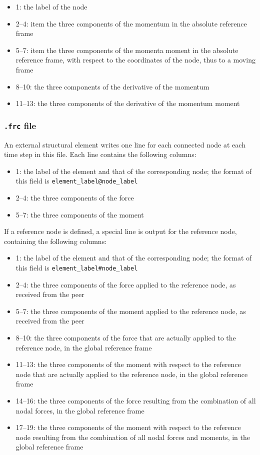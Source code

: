 \begin{itemize}
    \item 1: the label of the node
    \item 2–4: item the three components of the momentum in the absolute reference frame
    \item 5–7: item the three components of the momenta moment in the absolute reference frame, with respect to the coordinates of the node, thus to a moving frame
    \item 8–10: the three components of the derivative of the momentum
    \item 11–13: the three components of the derivative of the momentum moment
\end{itemize}
 
\subsubsection{\texttt{.frc} file}

An external structural element writes one line for each connected node at each time step in this file. Each line contains the following columns:

\begin{itemize}
    \item 1: the label of the element and that of the corresponding node; the format of this field is \texttt{element\_label@node\_label}
    \item 2–4: the three components of the force
    \item 5–7: the three components of the moment
\end{itemize}

If a reference node is defined, a special line is output for the reference node, containing the following columns:

\begin{itemize}
    \item 1: the label of the element and that of the corresponding node; the format of this field is \texttt{element\_label\#node\_label}
    \item 2–4: the three components of the force applied to the reference node, as received from the peer
    \item 5–7: the three components of the moment applied to the reference node, as received from the peer
    \item 8–10: the three components of the force that are actually applied to the reference node, in the global reference frame
    \item 11–13: the three components of the moment with respect to the reference node that are actually applied to the reference node, in the global reference frame
    \item  14–16: the three components of the force resulting from the combination of all nodal forces, in the global reference frame
    \item 17–19: the three components of the moment with respect to the reference node resulting from the combination of all nodal forces and moments, in the global reference frame
    
\end{itemize}


